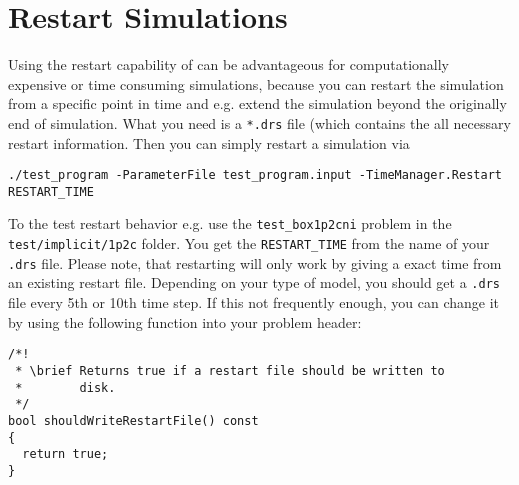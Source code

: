 \section{Restart \Dumux Simulations}
\label{sec:restartSimulations}

Using the restart capability of \Dumux can be advantageous for computationally
expensive or time consuming simulations, because you can restart the simulation
from a specific point in time and e.g. extend the simulation beyond the originally
end of simulation. What you need is a \texttt{*.drs} file (which contains the
all necessary restart information.
Then you can simply restart a simulation via
\begin{lstlisting}[style=Bash]
./test_program -ParameterFile test_program.input -TimeManager.Restart RESTART_TIME
\end{lstlisting}
To the test restart behavior e.g. use the \texttt{test\_box1p2cni} problem
in the \texttt{test/implicit/1p2c} folder.
You get the \texttt{RESTART\_TIME} from the name of your \texttt{.drs} file.
Please note, that restarting will only work by giving a exact time from
an existing restart file.
Depending on your type of model, you should get a \texttt{.drs} file every
5th or 10th time step. If this not frequently enough, you can change it
by using the following function into your problem header:
\begin{lstlisting}[style=DumuxCode]
/*!
 * \brief Returns true if a restart file should be written to
 *        disk.
 */
bool shouldWriteRestartFile() const
{
  return true;
}
\end{lstlisting}

